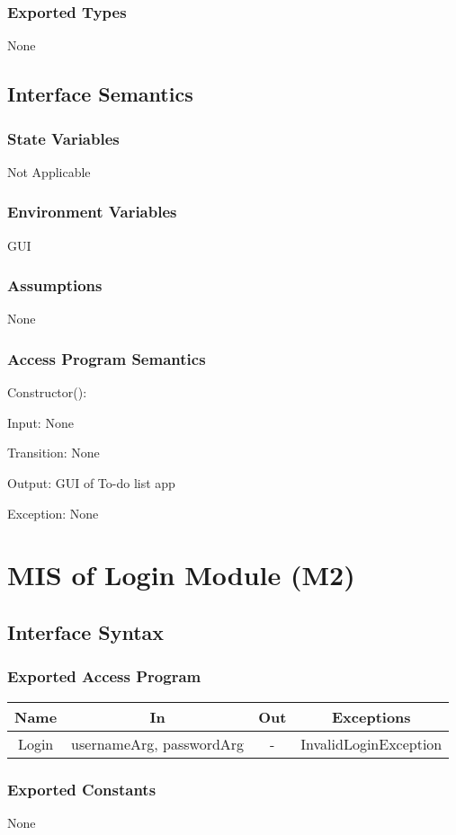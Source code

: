 \documentclass[12pt, titlepage]{article}
\begin{document}
\subsubsection{Exported Types}
None
\subsection{Interface Semantics}
\subsubsection{State Variables}
Not Applicable
\subsubsection{Environment Variables}
GUI
\subsubsection{Assumptions}
None
\subsubsection{Access Program Semantics}
Constructor():

    Input: None

    Transition: None

    Output: GUI of To-do list app

    Exception: None

\newpage



\section{MIS of Login Module (M2)}
\subsection{Interface Syntax}
\subsubsection{Exported Access Program}
\begin{tabular}[pos]{|c|c|c|c|}
    \hline
    \textbf{Name}& \textbf{In} & \textbf{Out} & \textbf{Exceptions} \\ \hline
    Login & usernameArg, passwordArg & - & InvalidLoginException \\ \hline
\end{tabular}
\subsubsection{Exported Constants}
None
\end{document}
